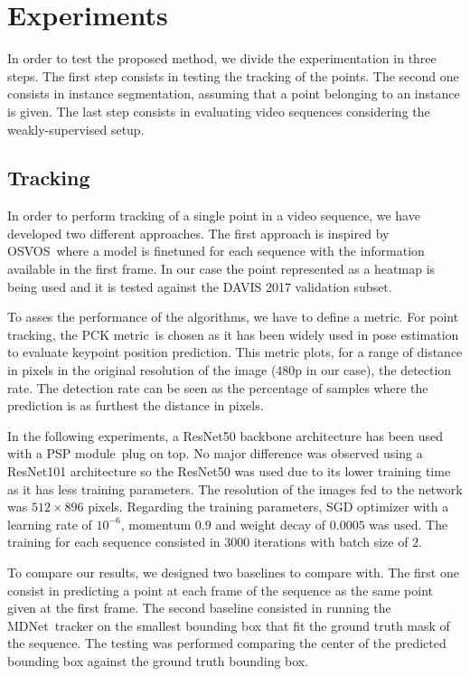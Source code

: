 \section{Experiments}

In order to test the proposed method, we divide the experimentation in three steps.
The first step consists in testing the tracking of the points.
The second one consists in instance segmentation, assuming that a point belonging to an instance is given.
The last step consists in evaluating video sequences considering the weakly-supervised setup.

\subsection{Tracking}

In order to perform tracking of a single point in a video sequence, we have developed two different approaches.
The first approach is inspired by OSVOS~\osvos where a model is finetuned for each sequence with the information available in the first frame.
In our case the point represented as a heatmap is being used and it is tested against the DAVIS 2017 validation subset.

To asses the performance of the algorithms, we have to define a metric.
For point tracking, the PCK metric~\pckmetric is chosen as it has been widely used in pose estimation to evaluate keypoint position prediction.
This metric plots, for a range of distance in pixels in the original resolution of the image (480p in our case), the detection rate.
The detection rate can be seen as the percentage of samples where the prediction is as furthest the distance in pixels.

In the following experiments, a ResNet50 backbone architecture has been used with a PSP module~\pspnet plug on top.
No major difference was observed using a ResNet101 architecture so the ResNet50 was used due to its lower training time as it has less training parameters.
The resolution of the images fed to the network was $512 \times 896$ pixels.
Regarding the training parameters, SGD optimizer with a learning rate of $10^{-6}$, momentum $0.9$ and weight decay of $0.0005$ was used. The training for each sequence consisted in 3000 iterations with batch size of $2$.

To compare our results, we designed two baselines to compare with.
The first one consist in predicting a point at each frame of the sequence as the same point given at the first frame.
The second baseline consisted in running the MDNet~\mdnet tracker on the smallest bounding box that fit the ground truth mask of the sequence.
The testing was performed comparing the center of the predicted bounding box against the ground truth bounding box.

